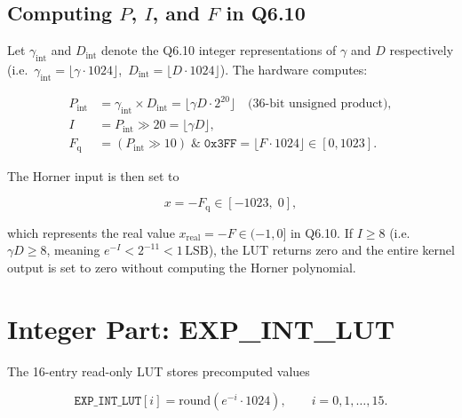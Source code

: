 \documentclass[11pt,a4paper]{article}
\begin{document}
\subsection{Computing $P$, $I$, and $F$ in Q6.10}

Let $\gamma_\text{int}$ and $D_\text{int}$ denote the Q6.10 integer
representations of $\gamma$ and $D$ respectively (i.e.\
$\gamma_\text{int} = \lfloor\gamma \cdot 1024\rfloor$,\
$D_\text{int} = \lfloor D \cdot 1024\rfloor$).  The hardware computes:

\begin{align}
  P_\text{int} &= \gamma_\text{int} \times D_\text{int}
                = \lfloor \gamma D \cdot 2^{20} \rfloor
                \quad \text{(36-bit unsigned product)}, \label{eq:p_int}\\[4pt]
  I &= P_\text{int} \gg 20
     = \lfloor \gamma D \rfloor, \label{eq:I}\\[4pt]
  F_\text{q} &= (P_\text{int} \gg 10)\;\&\;\texttt{0x3FF}
              = \lfloor F \cdot 1024 \rfloor
              \in [0, 1023]. \label{eq:Fq}
\end{align}

The Horner input is then set to

\begin{equation}
  x = -F_\text{q} \in [-1023,\; 0],
  \label{eq:x}
\end{equation}

which represents the real value $x_\text{real} = -F \in (-1, 0]$ in Q6.10.
If $I \geq 8$ (i.e.\ $\gamma D \geq 8$, meaning $e^{-I} < 2^{-11} < 1\,\text{LSB}$),
the LUT returns zero and the entire kernel output is set to zero without
computing the Horner polynomial.

\section{Integer Part: EXP\_INT\_LUT}

The 16-entry read-only LUT stores precomputed values

\begin{equation}
  \texttt{EXP\_INT\_LUT}[i] = \text{round}\!\left(e^{-i} \cdot 1024\right),
  \qquad i = 0, 1, \ldots, 15.
  \label{eq:lut_def}
\end{equation}
\end{document}
